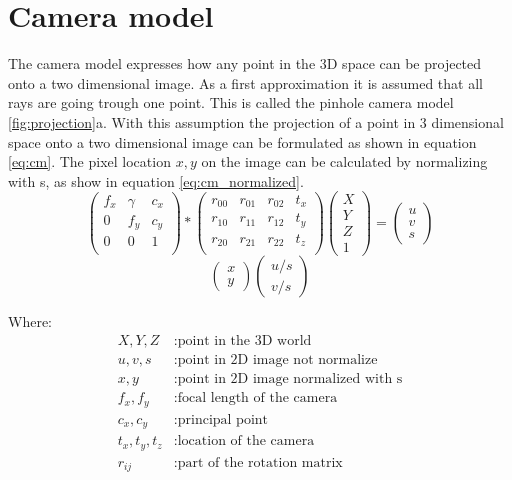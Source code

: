 \documentclass[11pt,a4paper,titlepage,oneside]{report}
\begin{document}
\section{Camera model}
The camera model expresses how any point in the 3D space can be projected onto a two dimensional image. As a first approximation it is assumed that all rays are going trough one point. This is called the pinhole camera model \ref{fig:projection}a. With this assumption the projection of a point in 3 dimensional space onto a two dimensional image can be formulated as shown in equation \ref{eq:cm}. The pixel location $x,y$ on the image can be calculated by normalizing with s, as show in equation \ref{eq:cm_normalized}.
\begin{equation}\label{eq:cm}
  \begin{pmatrix}
		f_x & \gamma & c_x \\
		0 & f_y & c_y \\
		0 & 0 & 1 \\
	\end{pmatrix}*
	\begin{pmatrix}
		r_{00} & r_{01} & r_{02} & t_x \\
		r_{10} & r_{11} & r_{12} & t_y \\
		r_{20} & r_{21} & r_{22} & t_z \\
	\end{pmatrix}
	\begin{pmatrix}
		X \\
		Y \\
		Z \\
		1
	\end{pmatrix}=
	\begin{pmatrix}
		u \\
		v \\
		s
  \end{pmatrix}
\end{equation}
\begin{equation}\label{eq:cm_normalized}
	\begin{pmatrix}
		x \\
		y
	\end{pmatrix}
	\begin{pmatrix}
		u/s \\
		v/s 
  \end{pmatrix}
\end{equation}

Where:
\begin{align*}
  X,Y,Z			&: \text{point in the 3D world}\\
	u,v,s	   	&: \text{point in 2D image not normalize}\\
	x,y				&: \text{point in 2D image normalized with s}\\
	f_x,f_y  	&: \text{focal length of the camera}\\
  c_x,c_y  	&: \text{principal point}\\
  t_x,t_y,t_z	&: \text{location of the camera}\\
  r_{ij}	&: \text{part of the rotation matrix}
\end{align*}
\end{document}

